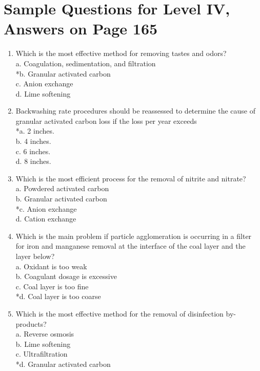 \section{Sample Questions for Level IV, Answers on Page 165}
\begin{enumerate}[label=TIV-\arabic*]
\item Which is the most effective method for removing tastes and odors?\\
a. Coagulation, sedimentation, and filtration\\
*b. Granular activated carbon\\
c. Anion exchange\\
d. Lime softening\\
\item Backwashing rate procedures should be reassessed to determine the cause of granular activated carbon loss if the loss per year exceeds\\
*a. 2 inches.\\
b. 4 inches.\\
c. 6 inches.\\
d. 8 inches.\\
\item Which is the most efficient process for the removal of nitrite and nitrate?\\
a. Powdered activated carbon\\
b. Granular activated carbon\\
*c. Anion exchange\\
d. Cation exchange\\
\item Which is the main problem if particle agglomeration is occurring in a filter for iron and manganese removal at the interface of the coal layer and the layer below?\\
a. Oxidant is too weak\\
b. Coagulant dosage is excessive\\
c. Coal layer is too fine\\
*d. Coal layer is too coarse\\
\item Which is the most effective method for the removal of disinfection by-products?\\
a. Reverse osmosis\\
b. Lime softening\\
c. Ultrafiltration\\
*d. Granular activated carbon\\
\end{enumerate}
